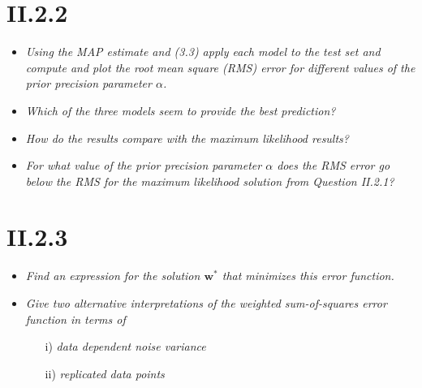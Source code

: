\documentclass[12pt, a4paper]{article}
\begin{document}
\section{II.2.2}
\begin{itemize}
\item \textit{Using the MAP estimate and (3.3) apply each model to the test
set and compute and plot the root mean square (RMS) error for different values
of the prior precision parameter $\alpha$.}
\item \textit{Which of the three models seem to provide
the best prediction?}
\item \textit{How do the results compare with the maximum likelihood
results?}
\item \textit{For what value of the prior precision parameter $\alpha$ does the RMS error go below the RMS for the maximum likelihood solution from Question II.2.1?}
\end{itemize}

\section{II.2.3}
\begin{itemize}
\item \textit{Find an expression for the solution $\textbf{w}^*$ that minimizes this error function.}
\item \textit{Give two alternative interpretations of the weighted sum-of-squares
error function in terms of}
\begin{itemize}
\item[i)] \textit{data dependent noise variance}
\item[ii)] \textit{replicated data points}
\end{itemize}
\end{itemize}
\end{document}
